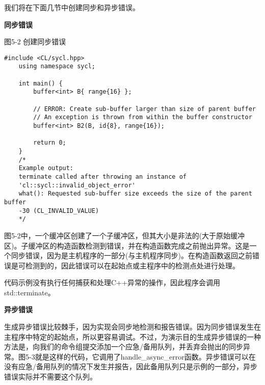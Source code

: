 我们将在下面几节中创建同步和异步错误。\par

\hspace*{\fill} \par %
\textbf{同步错误}

\hspace*{\fill} \par %
图5-2 创建同步错误
\begin{lstlisting}[caption={}]
	#include <CL/sycl.hpp>
	using namespace sycl;
	
	int main() {
		buffer<int> B{ range{16} };
		
		// ERROR: Create sub-buffer larger than size of parent buffer
		// An exception is thrown from within the buffer constructor
		buffer<int> B2(B, id{8}, range{16});
		
		return 0;
	}
	/*
	Example output:
	terminate called after throwing an instance of 
	'cl::sycl::invalid_object_error'
	what(): Requested sub-buffer size exceeds the size of the parent buffer 
	-30 (CL_INVALID_VALUE)
	*/
\end{lstlisting}

图5-2中，一个缓冲区创建了一个子缓冲区，但其大小是非法的(大于原始缓冲区)。子缓冲区的构造函数检测到错误，并在构造函数完成之前抛出异常。这是一个同步错误，因为是主机程序的一部分(与主机程序同步)。在构造函数返回之前错误是可检测到的，因此错误可以在起始点或主程序中的检测点处进行处理。\par

代码示例没有执行任何捕获和处理C++异常的操作，因此程序会调用std::terminate。\par

\hspace*{\fill} \par %
\textbf{异步错误}

生成异步错误比较棘手，因为实现会同步地检测和报告错误。因为同步错误发生在主程序中特定的起始点，所以更容易调试。不过，为演示目的生成异步错误的一种方法是，向我们的命令组提交添加一个应急/备用队列，并丢弃会抛出的同步异常。图5-3就是这样的代码，它调用了handle\_async\_error函数。异步错误可以在没有应急/备用队列的情况下发生并报告，因此备用队列只是示例的一部分，异步错误实际并不需要这个队列。\par

